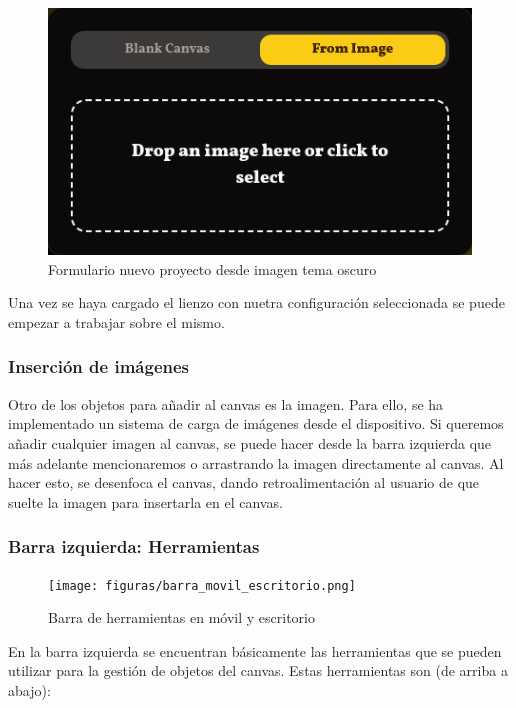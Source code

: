 \begin{figure}[H]
    \caption{Formulario nuevo proyecto desde imagen tema oscuro}
    \centering
    \vspace*{0.5cm}
    \includegraphics[scale=0.5]{figuras/meme_imagen_oscuro.png}
\end{figure}

Una vez se haya cargado el lienzo con nuetra configuración seleccionada se puede empezar a trabajar sobre el mismo.

\subsubsection{Inserción de imágenes}

Otro de los objetos para añadir al canvas es la imagen. Para ello, se ha implementado un sistema de carga de imágenes desde el dispositivo. Si queremos añadir cualquier imagen al canvas, se puede hacer desde la barra izquierda que más adelante mencionaremos o arrastrando la imagen directamente al canvas. Al hacer esto, se desenfoca el canvas, dando retroalimentación al usuario de que suelte la imagen para insertarla en el canvas.

\subsubsection{Barra izquierda: Herramientas}

\begin{figure}[H]
    \caption{Barra de herramientas en móvil y escritorio}
    \centering
    \vspace*{0.5cm}
    \texttt{[image: figuras/barra\_movil\_escritorio.png]}
\end{figure}

En la barra izquierda se encuentran básicamente las herramientas que se pueden utilizar para la gestión de objetos del canvas. Estas herramientas son (de arriba a abajo):

